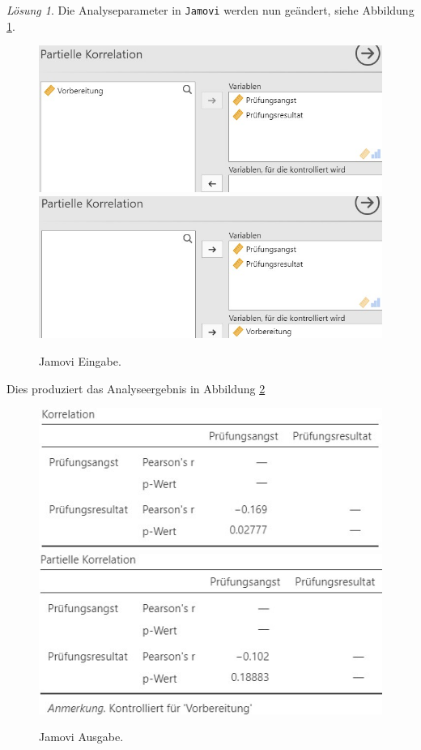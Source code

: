 \documentclass[
]{book}
\theoremstyle{definition}
\theoremstyle{definition}
\theoremstyle{definition}
\theoremstyle{definition}
\theoremstyle{remark}
\newtheorem*{solution}{Lösung}
\begin{document}
\begin{solution}

Die Analyseparameter in \texttt{Jamovi} werden nun geändert, siehe Abbildung \ref{fig:sol-test-preparation-input}.

\begin{figure}

{\centering \includegraphics[width=0.5\linewidth]{figures/08-exr-test-preparation-jmv-input1} \includegraphics[width=0.5\linewidth]{figures/08-exr-test-preparation-jmv-input2} 

}

\caption{Jamovi Eingabe.}\label{fig:sol-test-preparation-input}
\end{figure}

Dies produziert das Analyseergebnis in Abbildung \ref{fig:sol-test-preparation-output}

\begin{figure}

{\centering \includegraphics[width=0.5\linewidth]{figures/08-exr-test-preparation-jmv-output1} \includegraphics[width=0.5\linewidth]{figures/08-exr-test-preparation-jmv-output2} 

}

\caption{Jamovi Ausgabe.}\label{fig:sol-test-preparation-output}
\end{figure}


\end{solution}
\end{document}
